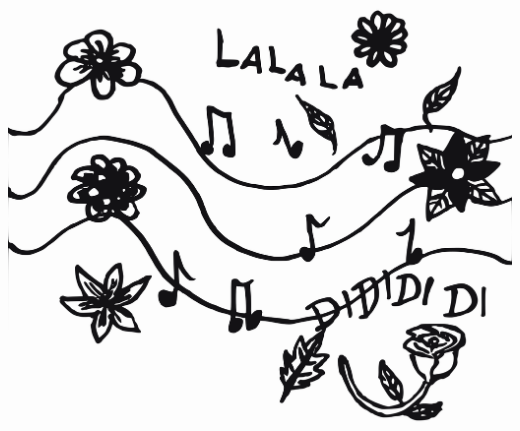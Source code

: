 
\begin{intersong}
\sffamily\bfseries\LARGE{}
\begin{center}
\includegraphics[scale=.1]{../bilder/fardigabilder/BilderTillKapitel/lalala.png} 
\end{center}
\end{intersong}
\sclearpage
\sclearpage

